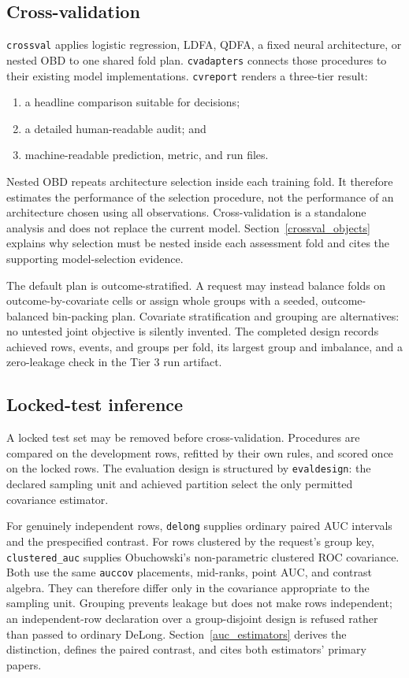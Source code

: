 \subsection{Cross-validation}

\texttt{crossval} applies logistic regression, LDFA, QDFA, a fixed
neural architecture, or nested OBD to one shared fold plan.
\texttt{cvadapters} connects those procedures to their existing model
implementations.  \texttt{cvreport} renders a three-tier result:

\begin{enumerate}
\item a headline comparison suitable for decisions;
\item a detailed human-readable audit; and
\item machine-readable prediction, metric, and run files.
\end{enumerate}

Nested OBD repeats architecture selection inside each training fold.
It therefore estimates the performance of the selection procedure,
not the performance of an architecture chosen using all observations.
Cross-validation is a standalone analysis and does not replace the
current model.
Section~\ref{crossval_objects} explains why selection must be nested inside each
assessment fold and cites the supporting model-selection evidence.

The default plan is outcome-stratified.  A request may instead balance
folds on outcome-by-covariate cells or assign whole groups with a
seeded, outcome-balanced bin-packing plan.  Covariate stratification
and grouping are alternatives: no untested joint objective is silently
invented.  The completed design records achieved rows, events, and
groups per fold, its largest group and imbalance, and a zero-leakage
check in the Tier 3 run artifact.

\subsection{Locked-test inference}

A locked test set may be removed before cross-validation.  Procedures
are compared on the development rows, refitted by their own rules, and
scored once on the locked rows.  The evaluation design is structured by
\texttt{evaldesign}: the declared sampling unit and achieved partition
select the only permitted covariance estimator.

For genuinely independent rows, \texttt{delong} supplies ordinary
paired AUC intervals and the prespecified contrast.  For rows clustered
by the request's group key, \texttt{clustered\_auc} supplies
Obuchowski's non-parametric clustered ROC covariance.  Both use the
same \texttt{auccov} placements, mid-ranks, point AUC, and contrast
algebra.  They can therefore differ only in the covariance appropriate
to the sampling unit.  Grouping prevents leakage but does not make rows
independent; an independent-row declaration over a group-disjoint
design is refused rather than passed to ordinary DeLong.
Section~\ref{auc_estimators} derives the distinction, defines the paired
contrast, and cites both estimators' primary papers.

